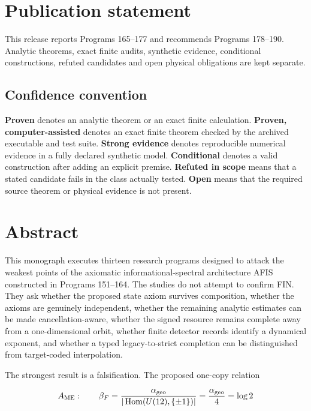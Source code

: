 \documentclass[11pt,a4paper,openany]{report}
\begin{document}
\chapter*{Publication statement}
This release reports Programs 165--177 and recommends Programs 178--190.
Analytic theorems, exact finite audits, synthetic evidence, conditional
constructions, refuted candidates and open physical obligations are kept
separate.

\tableofcontents
\clearpage
{}

\section{Confidence convention}

\textbf{Proven} denotes an analytic theorem or an exact finite calculation. \textbf{Proven, computer-assisted} denotes an exact finite theorem checked by the archived executable and test suite. \textbf{Strong evidence} denotes reproducible numerical evidence in a fully declared synthetic model. \textbf{Conditional} denotes a valid construction after adding an explicit premise. \textbf{Refuted in scope} means that a stated candidate fails in the class actually tested. \textbf{Open} means that the required source theorem or physical evidence is not present.

\chapter{Abstract}

This monograph executes thirteen research programs designed to attack the weakest points of the axiomatic informational-spectral architecture AFIS constructed in Programs 151--164. The studies do not attempt to confirm FIN. They ask whether the proposed state axiom survives composition, whether the axioms are genuinely independent, whether the remaining analytic estimates can be made cancellation-aware, whether the signed resource remains complete away from a one-dimensional orbit, whether finite detector records identify a dynamical exponent, and whether a typed legacy-to-strict completion can be distinguished from target-coded interpolation.

The strongest result is a falsification. The proposed one-copy relation

\[
A_{\rm ME}:\qquad
\beta_F=\frac{\alpha_{\rm geo}}
{|\operatorname{Hom}(U(12),\{\pm1\})|}
=\frac{\alpha_{\rm geo}}4=\log2
\]
\end{document}
